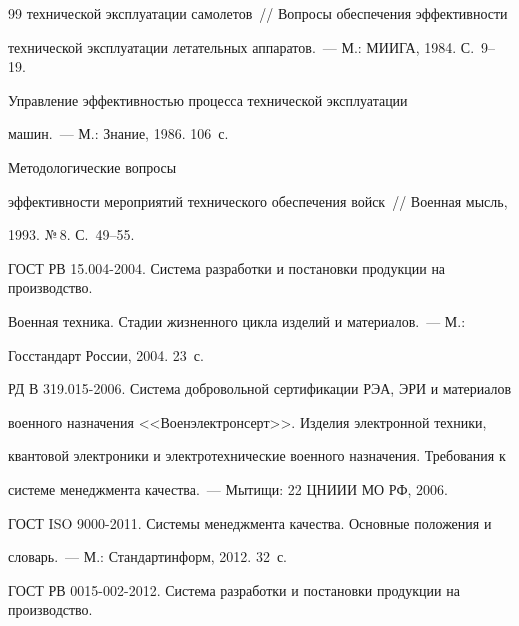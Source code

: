 {{\begin{thebibliography}{99}
технической эксплуатации самолетов~/\!\!/ Вопросы обеспечения эффективности 


технической эксплуатации летательных аппаратов.~--- М.: МИИГА, 1984. С.~9--19.




 Управление эффективностью процесса технической эксплуатации 


машин.~--- М.: Знание, 1986. 106~с.







 Методологические вопросы  


эффективности мероприятий технического обеспечения войск~/\!\!/ Военная мысль, 


1993. №\,8. С.~49--55.




ГОСТ РВ 15.004-2004. Система разработки и постановки продукции на производство. 


Военная техника. Стадии жизненного цикла изделий и материалов.~--- М.: 


Госстандарт России, 2004. 23~с.












РД В 319.015-2006. Система добровольной сертификации РЭА, ЭРИ и материалов 


военного назначения <<Военэлектронсерт>>. Изделия электронной техники, 


квантовой электроники и электротехнические военного назначения. Требования к 


системе менеджмента качества.~--- Мытищи: 22 ЦНИИИ МО РФ, 2006.







ГОСТ ISO 9000-2011. Системы менеджмента качества. Основные положения и 


словарь.~--- М.: Стандартинформ, 2012. 32~с.







ГОСТ РВ 0015-002-2012. Система разработки и постановки продукции на производство. 



\end{thebibliography}}}

